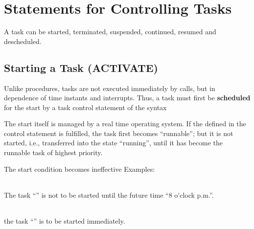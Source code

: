 


\section{Statements for Controlling Tasks}    %
\label{sec_tasking_statements}

A task can be started, terminated, suspended, continued, resumed and
descheduled.

\subsection{Starting a Task (ACTIVATE)}   %
\label{sec_task_activate}

Unlike procedures, tasks are not executed immediately by calls, but in
dependence of time instants and interrupts. Thus, a task must first be
{\bf scheduled} for the start by a task control statement of the
syntax

\begin{grammarframe}
\end{grammarframe}

The start itself is managed by a real time operating system. If
the  defined in the control statement is fulfilled,
the task first becomes ``runnable''; but it is not started, i.e.,
transferred into the state ``running'', until it has become the runnable
task of highest priority. %

The start condition becomes ineffective 
Examples:

\\
The task ``'' is not to be started until the
future time ``8 o'clock p.m.''.

\\ 
the task ``'' is to be started immediately.

